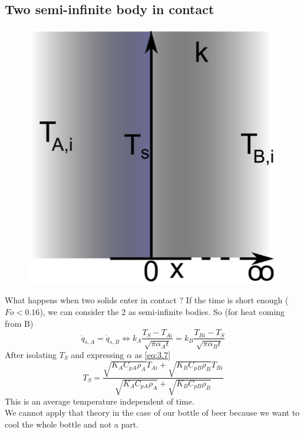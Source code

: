 	\subsection{Two semi-infinite body in contact}
		\begin{figure}
		\vspace{-5mm}
		\includegraphics[scale=0.3]{ch4/5}
		\end{figure}	
		What happens when two solids enter in contact ? If the time is short enough ($Fo < 0.16$), we can consider the 2 as semi-infinite bodies. So (for heat coming from B)
		\begin{equation}
			\dot{q}_{s,A} = \dot{q}_{s,B} \Leftrightarrow k_A \frac{T_S-T_{Ai}}{\sqrt{\pi \alpha _A t}} = k_B \frac{T_{Bi}-T_S}{\sqrt{\pi \alpha _B t}}
		\end{equation}
		After isolating $T_S$ and expressing $\alpha$ as \autoref{eq:3.7}
		\begin{equation}
			T_S = \frac{\sqrt{K_A C_{pA}\rho _A}T_{Ai} +\sqrt{K_B C_{pB}\rho _B}T_{Bi}}{\sqrt{K_A C_{pA}\rho _A}+\sqrt{K_B C_{pB}\rho _B}}
		\end{equation}
		This is an average temperature independent of time. \\
		We cannot apply that theory in the case of our bottle of beer because we want to cool the whole bottle and not a part.
		
